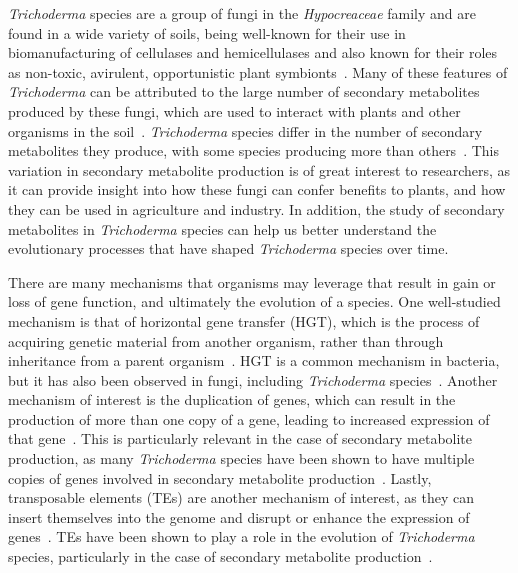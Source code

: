 \textit{Trichoderma} species are a group of fungi in the \textit{Hypocreaceae} family and are found in a wide variety of soils, being well-known for their use in biomanufacturing
of cellulases and hemicellulases and also known for their roles as non-toxic,
avirulent, opportunistic plant symbionts~\cite{woo2023a, kubicek2019a}. 
Many of these features of \textit{Trichoderma}
can be attributed to the large number of secondary metabolites
produced by these fungi, which are used to interact with plants and other organisms in the soil~\cite{Mukherjee2012}. \textit{Trichoderma} species differ in the number of secondary metabolites they produce, with some species producing more than others~\cite{Mukherjee2012}. This variation in secondary metabolite production is of great interest to researchers, as it can provide insight into how these fungi can confer benefits to plants, and how they can be used in agriculture and industry. In addition, the study of secondary metabolites in \textit{Trichoderma} species can help us better understand
the evolutionary processes that have shaped \textit{Trichoderma} species over time.

There are many mechanisms that organisms may leverage that result in gain or loss of gene function, and ultimately the evolution of a species. One well-studied mechanism is that of horizontal gene transfer (HGT), which is the process of acquiring genetic material from another organism, rather than through inheritance from a parent organism~\cite{goncalves2024}. HGT is a common mechanism in bacteria, but it has also been observed in fungi, including \textit{Trichoderma} species~\cite{goncalves2024}. Another mechanism of interest is the duplication of genes, which can result in the production of more than one copy of a gene, leading to increased expression of that gene~\cite{goncalves2024}. This is particularly relevant in the case of secondary metabolite production, as many \textit{Trichoderma} species have been shown to have multiple copies of genes involved in secondary metabolite production~\cite{Mukherjee2012}. Lastly, transposable elements (TEs) are another mechanism of interest, as they can insert themselves into the genome and disrupt or enhance the expression of genes~\cite{goncalves2024}. TEs have been shown to play a role in the evolution of \textit{Trichoderma} species, particularly in the case of secondary metabolite production~\cite{goncalves2024}. 

